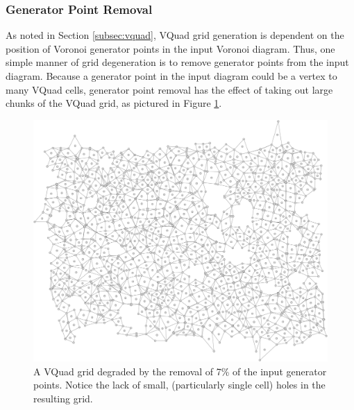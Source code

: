 \documentclass[a4paper,11pt]{article}
\begin{document}
\subsubsection{Generator Point Removal}
\label{subsec:gen_pt_rem}
As noted in Section \ref{subsec:vquad}, VQuad grid generation is dependent on the position of Voronoi generator points in the input Voronoi diagram. Thus, one simple manner of grid degeneration is to remove generator points from the input diagram. Because a generator point in the input diagram could be a vertex to many VQuad cells, generator point removal has the effect of taking out large chunks of the VQuad grid, as pictured in Figure \ref{fig:genpt_degen}.

\begin{figure}[htp]
\centering
\includegraphics[width=1.0\textwidth]{ch3_figs/gen_pt_degen_7}
\caption[Generator Point Degradation]{
  A VQuad grid degraded by the removal of 7\% of the input generator points. Notice the lack of small, (particularly single cell) holes in the resulting grid.
}
\label{fig:genpt_degen}
\end{figure}
\end{document}
